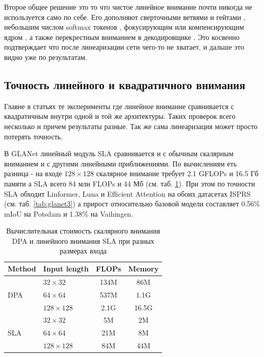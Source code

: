 \documentclass[areasetadvanced]{scrartcl}
\begin{document}
		Второе общее решение это то что чистое линейное внимание почти никогда не используется само по себе. Его дополняют сверточными ветвями и гейтами
		\cite{mlformer, rtlinearformer, abcfnet}, небольшим числом softmax токенов \cite{hlsmvit}, фокусирующим или компенсирующим ядром
		\cite{mslcfnet, uuekan}, а также перекрестным вниманием в декодировщике \cite{lsnet, pmp}. Это косвенно подтверждает что после линеаризации сети
		чего-то не хватает, и дальше это видно уже по результатам.

	\subsection{Точность линейного и квадратичного внимания}
		Главне в статьях те эксперименты где линейное внимание сравнивается с квадратичным внутри одной и той же
		архитектуры. Таких проверок всего несколько и причем результаты разные. Так же сама линеаризация может 
		просто потерять точность.

		В GLANet линейный модуль SLA сравнивается и с обычным скалярным вниманием и с другими линейными приближениями. 
		По вычислениям еть разница - на входе $128 \times 128$ скалярное внимание требует 2.1 GFLOPs и 16.5 Гб памяти а SLA всего 84 млн FLOPs и 44 Мб
		(см. таб. \ref{tab:glanet2}). При этом по точности SLA обходит Linformer, Luna и Efficient Attention на обоих датасетах ISPRS
		(см. таб. \ref{tab:glanet3}) а прирост относительно базовой модели составляет 0.56\% mIoU на Potsdam и 1.38\% на Vaihingen.

		\begin{table}[H]
			\centering
			\footnotesize
			\caption{Вычислительная стоимость скалярного внимания DPA и линейного внимания SLA при разных размерах входа \cite{glanet}}
			\label{tab:glanet2}
			\begin{tabular}{llcc}
				\toprule
				Method & Input length & FLOPs & Memory \\
				\midrule
				\multirow{3}{*}{DPA} & $32 \times 32$ & 134M & 86M \\
				 & $64 \times 64$ & 537M & 1.1G \\
				 & $128 \times 128$ & 2.1G & 16.5G \\
				\midrule
				\multirow{3}{*}{SLA} & $32 \times 32$ & 5M & 2M \\
				 & $64 \times 64$ & 21M & 8M \\
				 & $128 \times 128$ & 84M & 44M \\
				\bottomrule
			\end{tabular}
		\end{table}
\end{document}
